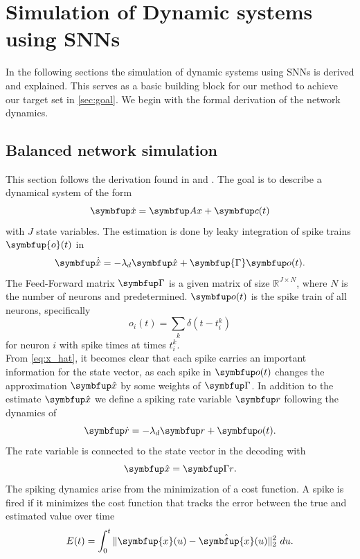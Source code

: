 \section{Simulation of Dynamic systems using SNNs}\label{sec:simulation}
In the following sections the simulation of dynamic systems using \acp{SNN} is derived and explained. This serves as a basic building block for our method to achieve our target set in \cref{sec:goal}. We begin with the formal derivation of the network dynamics.

\subsection{Balanced network simulation}\label{ssec:balanced_network_sim}
This section follows the derivation found in \cite{boerlin_predictive_2013} and \cite{huang_dynamics_2019}.
The goal is to describe a dynamical system of the form
\begin{equation}\label{eq:x}
\bmu{\dot{x}} = \bmu{Ax} + \bmu{c}(t)
\end{equation}
with $J$ state variables.
The estimation is done by leaky integration of spike trains $\symbfup{o}(t)$ in
\begin{equation}\label{eq:x_hat}
\bmu{\dot{\hat{x}}} = -\lambda_d \bmu{\hat{x}} + \symbfup{\Gamma} \bmu{o}(t).
\end{equation}
The Feed-Forward matrix $\bmu{\Gamma}$ is a given matrix of size $\mathbb{R}^{J\times N}$, where $N$ is the number of neurons and predetermined. $\bmu{o}(t)$ is the spike train of all neurons, specifically
\begin{equation}
	o_i(t) = \sum_k \delta(t - t^k_i)
\end{equation}
for neuron $i$ with spike times at times $t_i^k$.\\
From \cref{eq:x_hat}, it becomes clear that each spike carries an important information for the state vector, as each spike in $\bmu{o}(t)$ changes the approximation $\bmu{\hat{x}}$ by some weights of $\bmu{\Gamma}$.
In addition to the estimate $\bmu{\hat{x}}$ we define a spiking rate variable $\bmu{r}$ following the dynamics of
\begin{equation}\label{eq:rate}
\bmu{\dot{r}} = -\lambda_d\bmu{r} + \bmu{o}(t).
\end{equation}
The rate variable is connected to the state vector in the decoding with
\begin{equation}\label{eq:decoding}
	\bmu{\hat{x}} = \bmu{\Gamma r}.
\end{equation}
The spiking dynamics arise from the minimization of a cost function. A spike is fired if it minimizes the cost function that tracks the error between the true and estimated value over time
\begin{equation}\label{eq:cost_func_basic}
E(t)=\int_0^t \|\symbfup{x}(u)-\hat{\symbfup{x}}(u)\|_2^2 \ du.
\end{equation}


